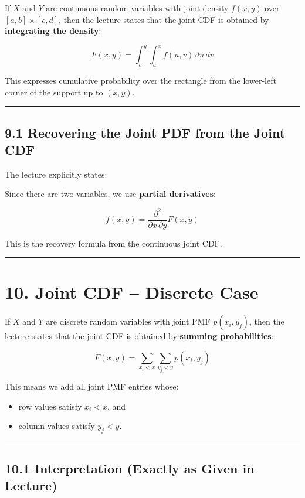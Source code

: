 \documentclass[12pt]{article}
\begin{document}
If \(X\) and \(Y\) are continuous random variables with joint density \(f(x,y)\) over \([a,b]\times[c,d]\), then the lecture states that the joint CDF is obtained by \textbf{integrating the density}:

\[
F(x,y)=\int_c^y\int_a^x f(u,v)\,du\,dv
\]

This expresses cumulative probability over the rectangle from the lower-left corner of the support up to \((x,y)\).

\hrule
\vspace{1em}

\subsection*{9.1 Recovering the Joint PDF from the Joint CDF}

The lecture explicitly states:

Since there are two variables, we use \textbf{partial derivatives}:

\[
f(x,y)=\frac{\partial^2}{\partial x\,\partial y}F(x,y)
\]

This is the recovery formula from the continuous joint CDF.

\hrule
\vspace{1em}

\section*{10. Joint CDF – Discrete Case}

If \(X\) and \(Y\) are discrete random variables with joint PMF \(p(x_i,y_j)\), then the lecture states that the joint CDF is obtained by \textbf{summing probabilities}:

\[
F(x,y)=\sum_{x_i<x}\sum_{y_j<y} p(x_i,y_j)
\]

This means we add all joint PMF entries whose:

\begin{itemize}
    \item row values satisfy \(x_i<x\), and
    \item column values satisfy \(y_j<y\).
\end{itemize}

\hrule
\vspace{1em}

\subsection*{10.1 Interpretation (Exactly as Given in Lecture)}
\end{document}
